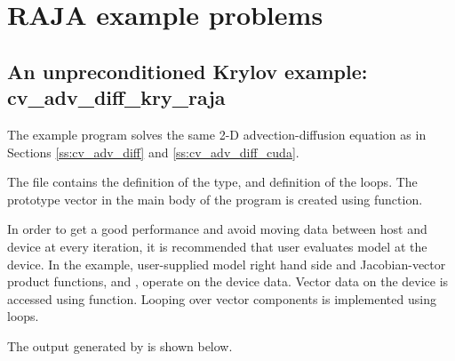 \section{RAJA example problems}\label{s:ex_raja}



\subsection{An unpreconditioned Krylov example: cv\_adv\_diff\_kry\_raja}\label{ss:cv_adv_diff_raja}

The example program  solves the same 2-D
advection-diffusion equation as in Sections \ref{ss:cv_adv_diff} and
\ref{ss:cv_adv_diff_cuda}.

The file  contains the definition of the {\raja}
 type, and  definition of the {\raja}
 loops. The prototype vector in the main body of the program is created
using  function. 

In order to get a good performance and avoid moving data between host
and device at every iteration, it is recommended that user evaluates  
model at the device. In the example, user-supplied model right hand side 
and Jacobian-vector product functions,  and , operate on 
the device data. Vector data on the device is accessed using 
 function. Looping over vector 
components is implemented using {\raja}  loops.

The output generated by  is shown below.


